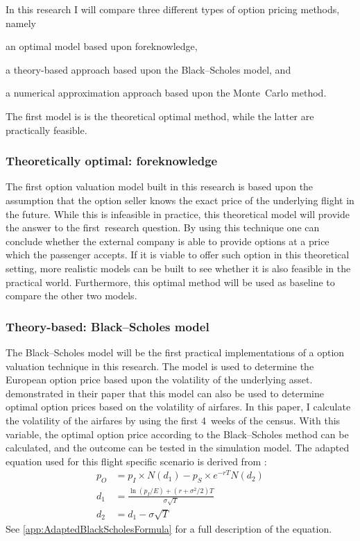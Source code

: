 In this research I will compare three different types of option pricing methods, name\-ly \begin{inparaenum}
\item an optimal model based upon foreknowledge,
\item a theory-based approach based upon the Black--Scholes model, and
\item a numerical approximation approach based upon the Monte~Carlo method.
\end{inparaenum} The first model is is the theoretical optimal method, while the latter are practically feasible.

\subsubsection{Theoretically optimal: foreknowledge}
The first option valuation model built in this research is based upon the assumption that the option seller knows the exact price of the underlying flight in the future. While this is infeasible in practice, this theoretical model will provide the answer to the first~research question. By using this technique one can conclude whether the external company is able to provide options at a price which the passenger accepts. If it is viable to offer such option in this theoretical setting, more realistic models can be built to see whether it is also feasible in the practical world. Furthermore, this optimal method will be used as baseline to compare the other two models. 

\subsubsection{Theory-based: Black--Scholes model}
The Black--Scholes model will be the first practical implementations of a option valuation technique in this research. The model is used to determine the European option price based upon the volatility of the underlying asset.  demonstrated in their paper that this model can also be used to determine optimal option prices based on the volatility of airfares. In this paper, I calculate the volatility of the airfares by using the first 4~weeks of the census. With this variable, the optimal option price according to the Black--Scholes method can be calculated, and the outcome can be tested in the simulation model. The adapted equation used for this flight specific scenario is derived from :
\begin{align*}
p_O &= p_I \times N(d_1) - p_S \times e^{-rT}N(d_2) \\
d_1 &= \frac{\ln(p_I/E) + (r + \sigma^2/2)T}{\sigma \sqrt{T}} \\
d_2 &= d_1 - \sigma \sqrt{T}
\end{align*}
See \cref{app:AdaptedBlackScholesFormula} for a full description of the equation.

